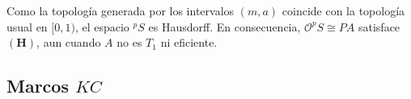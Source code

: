\documentclass[11pt]{amsart}
\DeclareMathOperator{\tp}{tp}
\theoremstyle{plain}
\newtheorem{prop}[thm]{Proposición}
\theoremstyle{definition}
\begin{document}
Como la topología generada por los intervalos $(m,a)$ coincide con la topología usual en $[0,1)$, el espacio $^pS$ es Hausdorff. En consecuencia, $\mathcal{O}^pS\cong PA$ satisface $\mathbf{(H)}$, aun cuando $A$ no es $T_1$ ni eficiente.

\subsection{Marcos $KC$}






%
\end{document}
